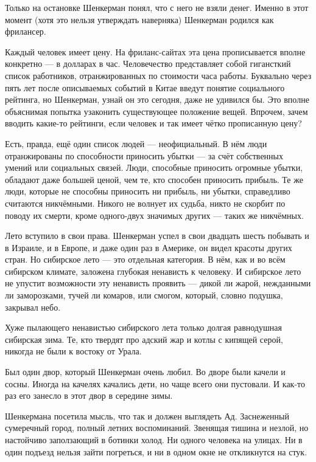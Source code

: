 Только на остановке Шенкерман понял, что с него не взяли денег.
Именно в этот момент (хотя это нельзя утверждать наверняка) Шенкерман родился как фрилансер.

Каждый человек имеет цену.
На фриланс-сайтах эта цена прописывается вполне конкретно --- в долларах в час.
Человечество представляет собой гигансткий список работников, отранжированных по стоимости часа работы.
Буквально через пять лет после описываемых событий в Китае введут понятие социального рейтинга, но Шенкерман, узнай он это сегодня, даже не удивился бы.
Это вполне объяснимая попытка узаконить существующее положение вещей.
Впрочем, зачем вводить какие-то рейтинги, если человек и так имеет чётко прописанную цену?

Есть, правда, ещё один список людей --- неофициальный.
В нём люди отранжированы по способности приносить убытки --- за счёт собственных умений или социальных связей.
Люди, способные приносить огромные убытки, обладают даже большей ценой, чем те, кто способен приносить прибыль.
Те же люди, которые не способны приносить ни прибыль, ни убытки, справедливо считаются никчёмными.
Никого не волнует их судьба, никто не скорбит по поводу их смерти, кроме одного-двух значимых других --- таких же никчёмных.

\asterism

Лето вступило в свои права.
Шенкерман успел в свои двадцать шесть побывать и в Израиле, и в Европе, и даже один раз в Америке, он видел красоты других стран.
Но сибирское лето --- это отдельная категория.
В нём, как и во всём сибирском климате, заложена глубокая ненависть к человеку.
И сибирское лето не упустит возможности эту ненависть проявить --- дикой ли жарой, нежданными ли заморозками, тучей ли комаров, или смогом, который, словно подушка, закрывал небо.

Хуже пылающего ненавистью сибирского лета только долгая равнодушная сибирская зима.
Те, кто твердят про адский жар и котлы с кипящей серой, никогда не были к востоку от Урала.

Был один двор, который Шенкерман очень любил.
Во дворе были качели и сосны.
Иногда на качелях качались дети, но чаще всего они пустовали.
И как-то раз его занесло в этот двор в середине зимы.

Шенкермана посетила мысль, что так и должен выглядеть Ад.
Заснеженный сумеречный город, полный летних воспоминаний.
Звенящая тишина и незлой, но настойчиво заползающий в ботинки холод.
Ни одного человека на улицах.
Ни в один подъезд нельзя зайти погреться, и ни в одном окне не откликнутся на стук.

